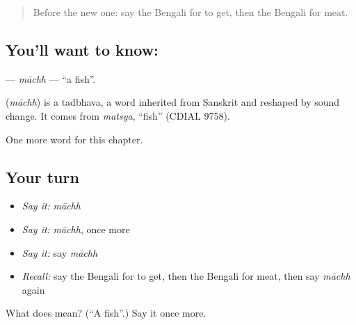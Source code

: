 \label{lesson:BN-C55-machh}



\begin{quote}
Before the new one: say the Bengali for to get, then the Bengali for meat.
\end{quote}

\subsection*{You'll want to know: }
\textbf{} — \emph{māchh} — \textquotedblleft{}a fish\textquotedblright{}.

\begin{cousinweb}
\textbf{} (\emph{māchh}) is a tadbhava, a word inherited from Sanskrit and reshaped by sound change. It comes from \emph{matsya}, \textquotedblleft{}fish\textquotedblright{} (CDIAL 9758).
\end{cousinweb}

\begin{grammarlens}[title={What you've built}]
One more word for this chapter.
\end{grammarlens}

\subsection*{Your turn}
\begin{itemize}
\raggedright
  \item \emph{Say it:} \emph{māchh}
  \item \emph{Say it:} \emph{māchh}, once more
  \item \emph{Say it:} say \emph{māchh}
  \item \emph{Recall:} say the Bengali for to get, then the Bengali for meat, then say \emph{māchh} again
\end{itemize}

\begin{tcolorbox}[breakable,colback=teal!4,colframe=teal!35!black,title={Before you move on}]
What does  mean? (\textquotedblleft{}A fish\textquotedblright{}.) Say it once more.
\end{tcolorbox}

